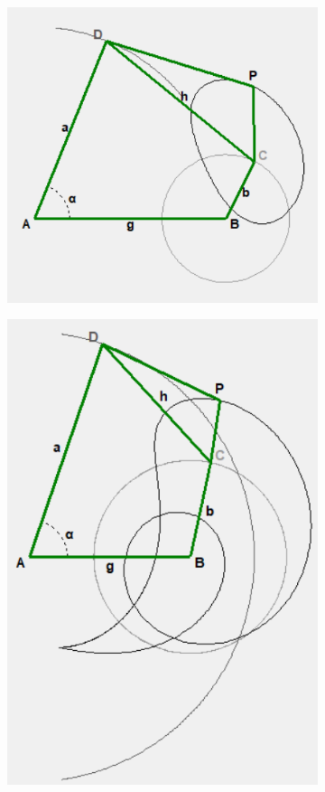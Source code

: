 \documentclass{article}
\begin{document}
\begin{figure}[h]
\begin{subfigure}{0.19\textwidth}
		\caption{}
	\end{subfigure}
	\hfill
	\begin{subfigure}{0.19\textwidth}
		\centering
		\includegraphics[width=\linewidth, height=0.95\linewidth, keepaspectratio]{./Figures/27_motion_cases/1-1-1.png}
		\caption{}
	\end{subfigure}
	\vfill
	\begin{subfigure}{0.19\textwidth}
		\centering
		\includegraphics[width=\linewidth, height=0.95\linewidth, keepaspectratio]{./Figures/27_motion_cases/0-1-1.png}

\end{subfigure}
\end{figure}
\end{document}

